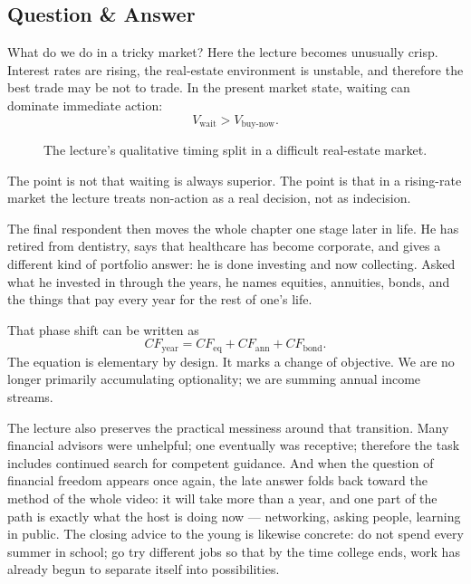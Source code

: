\subsection{Question \& Answer}

What do we do in a tricky market? Here the lecture becomes unusually crisp. Interest rates are rising, the real-estate environment is unstable, and therefore the best trade may be not to trade. In the present market state, waiting can dominate immediate action:
\begin{equation}
V_{\text{wait}} > V_{\text{buy-now}}.
\end{equation}

\begin{figure}[htbp]
\centering
{}
\caption{The lecture's qualitative timing split in a difficult real-estate market.}
\end{figure}

The point is not that waiting is always superior. The point is that in a rising-rate market the lecture treats non-action as a real decision, not as indecision.

The final respondent then moves the whole chapter one stage later in life. He has retired from dentistry, says that healthcare has become corporate, and gives a different kind of portfolio answer: he is done investing and now collecting. Asked what he invested in through the years, he names equities, annuities, bonds, and the things that pay every year for the rest of one's life.

That phase shift can be written as
\begin{equation}
CF_{\text{year}} = CF_{\text{eq}} + CF_{\text{ann}} + CF_{\text{bond}}.
\end{equation}
The equation is elementary by design. It marks a change of objective. We are no longer primarily accumulating optionality; we are summing annual income streams.

The lecture also preserves the practical messiness around that transition. Many financial advisors were unhelpful; one eventually was receptive; therefore the task includes continued search for competent guidance. And when the question of financial freedom appears once again, the late answer folds back toward the method of the whole video: it will take more than a year, and one part of the path is exactly what the host is doing now --- networking, asking people, learning in public. The closing advice to the young is likewise concrete: do not spend every summer in school; go try different jobs so that by the time college ends, work has already begun to separate itself into possibilities.

